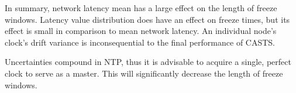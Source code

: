 
In summary, network latency mean has a large effect on the length of freeze 
windows. Latency value distribution does have an effect on freeze times, but
its effect is small in comparison to mean network latency. An
individual node's clock's drift variance is inconsequential to the
final performance of CASTS.

Uncertainties compound in NTP, thus it is advisable to acquire a
single, perfect clock to serve as a master. This will significantly
decrease the length of freeze windows.


